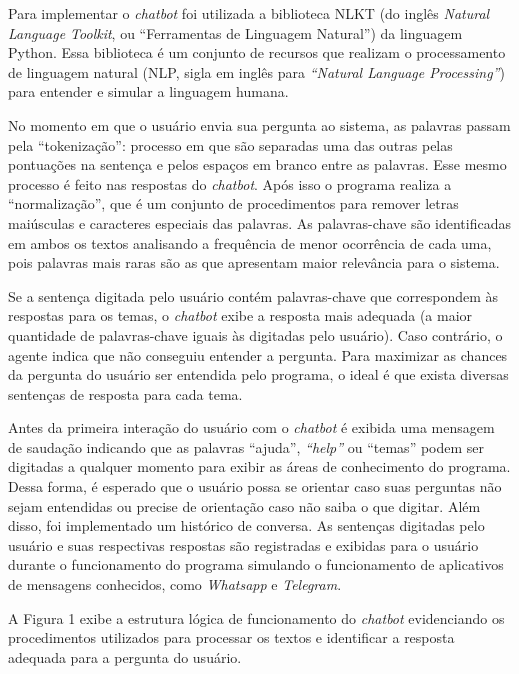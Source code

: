 \documentclass[12pt]{article}
\begin{document}
Para implementar o {\itshape chatbot} foi utilizada a biblioteca NLKT (do inglês {\itshape Natural Language Toolkit}, ou “Ferramentas de Linguagem Natural”) da linguagem Python. Essa biblioteca é um conjunto de recursos que realizam o processamento de linguagem natural (NLP, sigla em inglês para {\itshape “Natural Language Processing”}) para entender e simular a linguagem humana.

No momento em que o usuário envia sua pergunta ao sistema, as palavras passam pela “tokenização”: processo em que são separadas uma das outras pelas pontuações na sentença e pelos espaços em branco entre as palavras. Esse mesmo processo é feito nas respostas do {\itshape chatbot}. Após isso o programa realiza a “normalização”, que é um conjunto de procedimentos para remover letras maiúsculas e caracteres especiais das palavras. As palavras-chave são identificadas em ambos os textos analisando a frequência de menor ocorrência de cada uma, pois palavras mais raras são as que apresentam maior relevância para o sistema.

Se a sentença digitada pelo usuário contém palavras-chave que correspondem às respostas para os temas, o {\itshape chatbot} exibe a resposta mais adequada (a maior quantidade de palavras-chave iguais às digitadas pelo usuário). Caso contrário, o agente indica que não conseguiu entender a pergunta. Para maximizar as chances da pergunta do usuário ser entendida pelo programa, o ideal é que exista diversas sentenças de resposta para cada tema.

Antes da primeira interação do usuário com o {\itshape chatbot} é exibida uma mensagem de saudação indicando que as palavras “ajuda”, {\itshape “help”} ou “temas” podem ser digitadas a qualquer momento para exibir as áreas de conhecimento do programa. Dessa forma, é esperado que o usuário possa se orientar caso suas perguntas não sejam entendidas ou precise de orientação caso não saiba o que digitar. Além disso, foi implementado um histórico de conversa. As sentenças digitadas pelo usuário e suas respectivas respostas são registradas e exibidas para o usuário durante o funcionamento do programa simulando o funcionamento de aplicativos de mensagens conhecidos, como {\itshape Whatsapp} e {\itshape Telegram}.

A Figura 1 exibe a estrutura lógica de funcionamento do {\itshape chatbot} evidenciando os procedimentos utilizados para processar os textos e identificar a resposta adequada para a pergunta do usuário.
\end{document}
